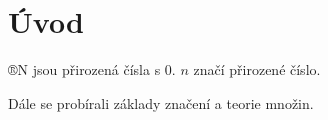 \documentclass[12pt]{article}                   %
\begin{document}
\section{Úvod}
    \begin{poznamka}[Domluva]
        ®N jsou přirozená čísla s 0. $n$ značí přirozené číslo.
    \end{poznamka}

    Dále se probírali základy značení a teorie množin.
\end{document}
